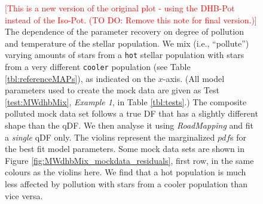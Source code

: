 \documentclass[iop,revtex4]{emulateapj}
\newcommand{\pdf}{\ensuremath{pdf}}
\newcommand{\RM}{{\sl RoadMapping}}
\newcommand{\NOTE}[1]{\textcolor{Red}{#1}}
\begin{document}
\begin{figure}[!htbp]
\caption{\NOTE{[This is a new version of the original plot - using the DHB-Pot instead of the Iso-Pot. (TO DO: Remove this note for final version.)]} The dependence of the parameter recovery on degree of pollution and temperature of the stellar population. We mix (i.e., ``pollute'') varying amounts of stars from a \texttt{hot} stellar population with stars from a very different \texttt{cooler} population (see Table \ref{tbl:referenceMAPs}), as indicated on the $x$-axis. (All model parameters used to create the mock data are given as Test \ref{test:MWdhbMix}, \emph{Example 1}, in Table \ref{tbl:tests}.) The composite polluted mock data set follows a true DF that has a slightly different shape than the qDF. We then analyse it using \RM{} and fit a \emph{single} qDF only. The violins represent the marginalized \pdf{}s for the best fit model parameters.  Some mock data sets are shown in Figure \ref{fig:MWdhbMix_mockdata_residuals}, first row, in the same colours as the violins here.  We find that a hot population is much less affected by pollution with stars from a cooler population than vice versa.}
\label{fig:MWdhbMixCont}
\end{figure}
\end{document}
